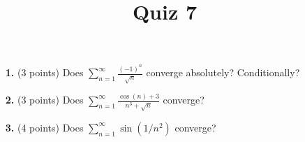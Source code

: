 \documentclass[12pt]{amsart}
\title{Quiz 7}
\begin{document}
\maketitle
\thispagestyle{fancy}

\vskip0.25in
\begin{enumerate}


\item[\textbf{1. }] (3 points) Does $\displaystyle \sum_{n=1}^\infty \frac{(-1)^n}{\sqrt{n}}$ converge absolutely? Conditionally?

\vskip 2in

\item[\textbf{2. }](3 points) Does $\displaystyle \sum_{n=1}^\infty \frac{\cos(n) + 3}{n^3 + \sqrt{n}}$ converge?
 
\vskip 2in

\item[\textbf{3. }] (4 points) Does $\displaystyle \sum_{n=1}^\infty \sin(1/n^2)$ converge?


\end{enumerate}
\end{document}

